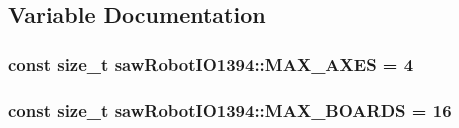 \subsection{Variable Documentation}
\hypertarget{namespacesaw_robot_i_o1394_a397b95aa9a72ba9aaf6cf10c9ef6a37a}{}
\subsubsection[{M\+A\+X\+\_\+\+A\+X\+E\+S}]{\setlength{\rightskip}{0pt plus 5cm}const size\+\_\+t saw\+Robot\+I\+O1394\+::\+M\+A\+X\+\_\+\+A\+X\+E\+S = 4}\label{namespacesaw_robot_i_o1394_a397b95aa9a72ba9aaf6cf10c9ef6a37a}
\hypertarget{namespacesaw_robot_i_o1394_a2ea4cc88435b1ca85b6c633ba6360af4}{}
\subsubsection[{M\+A\+X\+\_\+\+B\+O\+A\+R\+D\+S}]{\setlength{\rightskip}{0pt plus 5cm}const size\+\_\+t saw\+Robot\+I\+O1394\+::\+M\+A\+X\+\_\+\+B\+O\+A\+R\+D\+S = 16}\label{namespacesaw_robot_i_o1394_a2ea4cc88435b1ca85b6c633ba6360af4}
